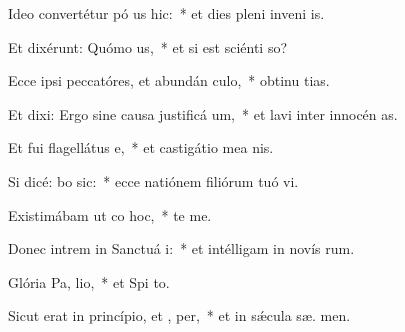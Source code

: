 \item Ideo convertétur pó us hic:~* et dies pleni inveni  is.
\item Et dixérunt: Quómo  us,~* et si est sciénti  so?
\item Ecce ipsi peccatóres, et abundán  culo,~* obtinu tias.
\item Et dixi: Ergo sine causa justificá  um,~* et lavi inter innocén  as.
\item Et fui flagellátus  e,~* et castigátio mea  nis.
\item Si dicé: bo sic:~* ecce natiónem filiórum tuó vi.
\item Existimábam ut co hoc,~*   te me.
\item Donec intrem in Sanctuá i:~* et intélligam in novís rum.
\item Glória Pa,  lio,~* et Spi to.
\item Sicut erat in princípio, et ,  per,~* et in sǽcula sæ. men.
